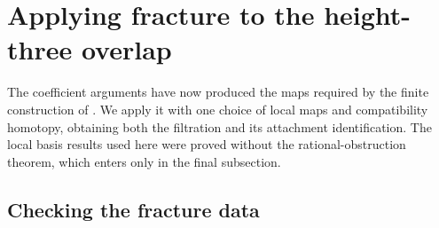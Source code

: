 \section{Applying fracture to the height-three overlap}\label{sec:application}

The coefficient arguments have now produced the maps required by the
finite construction of .  We apply it with one
choice of local maps and compatibility homotopy, obtaining both the
filtration and its attachment identification.  The local basis results
used here were proved without the rational-obstruction theorem, which
enters only in the final subsection.

\subsection{Checking the fracture data}

